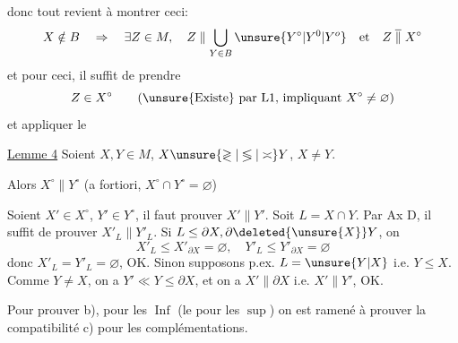 
donc tout revient à montrer ceci:
\[
X\notin B\quad\Rightarrow\quad\exists Z\in M,\quad Z\parallel\bigcup_{Y\in B}\unsure{Y^\circ|Y^0|Y^o}\quad\text{et}\quad Z\mathrel{\overline{\parallel}}X^\circ
\]
et pour ceci, il suffit de prendre
\[
Z\in X^\circ\qquad\text{(\unsure{Existe} par L1, impliquant }X^\circ\ne\varnothing\text{)}
\]
et appliquer le

\margin{$\big\vert\!\big\vert\!\big\vert$}
\uline{Lemme 4} Soient $X,Y\in M$, $X\unsure{\gtrless|\lessgtr|\asymp}Y$, $X\ne Y$.

Alors $X^\circ\parallel Y^\circ$ (a fortiori, $X^\circ\cap Y^\circ=\varnothing$)

Soient $X'\in X^\circ$, $Y'\in Y^\circ$, il faut prouver $X'\parallel Y'$.
Soit $L=X\cap Y$. Par Ax D, il suffit de prouver $X'_L\parallel Y'_L$. Si $L\leq\partial X,\partial\deleted{\unsure{X}}Y$,   on 
\[
X'_L\leq X'_{\partial X}=\varnothing,\quad Y'_L\leq Y'_{\partial X}=\varnothing
\]
donc $X'_L=Y'_L=\varnothing$, OK. Sinon  supposons p.ex. $L=\unsure{Y|X}$ i.e. $Y\leq X$. Comme $Y\ne X$, on a $Y'\ll Y\leq\partial X$, et on a $X'\parallel\partial X$ i.e. $X'\parallel Y'$, OK.

Pour prouver b),  pour les $\operatorname{Inf}$ (le  pour les $\operatorname{sup}$) on est ramené à prouver la  compatibilité c) pour les complémentations. 
